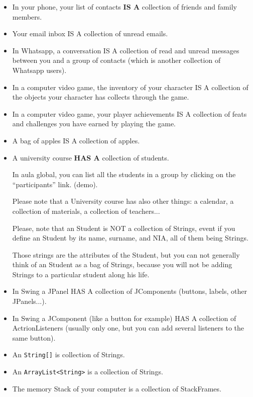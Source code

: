 \documentclass[a4paper, 9pt]{extarticle}
\begin{document}
\begin{itemize}

  \item In your phone, your list of contacts \textbf{IS A} collection of friends and family members.

  \item Your email inbox IS A collection of unread emails.

  \item In Whatsapp, a conversation IS A collection of read and unread messages between you and a group of contacts (which is another collection of Whatsapp users).

  \item In a computer video game, the inventory of your character IS A collection of the objects your character has collects through the game.

  \item In a computer video game, your player achievements IS A collection of feats and challenges you have earned by playing the game.

  \item A bag of apples IS A collection of apples.

  \item A university course \textbf{HAS A} collection of students.

    In aula global, you can list all the students in a group by clicking on the ``participants'' link. (demo).

    Please note that a University course has also other things: a calendar, a collection of materials, a collection of teachers...

    Please, note that an Student is NOT a collection of Strings, event if you define an Student by its name, surname, and NIA, all of them being Strings.

    Those strings are the attributes of the Student, but you can not generally
    think of an Student as a bag of Strings, because you will not be adding
    Strings to a particular student along his life.

  \item In Swing a JPanel HAS A collection of JComponents (buttons, labels, other JPanels...).

  \item In Swing a JComponent (like a button for example) HAS A collection of
    ActrionListeners (usually only one, but you can add several listeners to
    the same button).

  \item An \verb+String[]+ is collection of Strings.

  \item An \verb+ArrayList<String>+ is a collection of Strings.

  \item The memory Stack of your computer is a collection of StackFrames.

\end{itemize}
\end{document}
